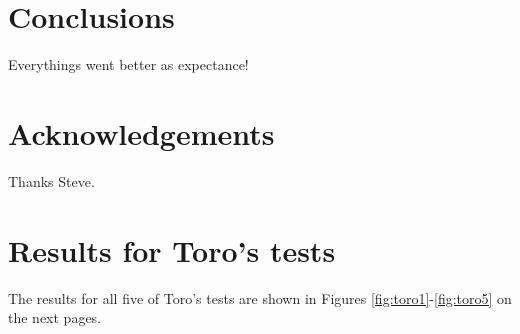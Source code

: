 \documentclass[final,3p,twocolumn]{elsarticle}
\begin{document}
\section{Conclusions}
\label{sec:conclusion}

Everythings went better as expectance!

\section*{Acknowledgements}
\label{sec:acknowledgements}
Thanks Steve. 




\appendix
\section{Results for Toro's tests}
\label{app:toro}

The results for all five of Toro's tests are shown in Figures
\ref{fig:toro1}-\ref{fig:toro5} on the next pages. 

\end{document}
